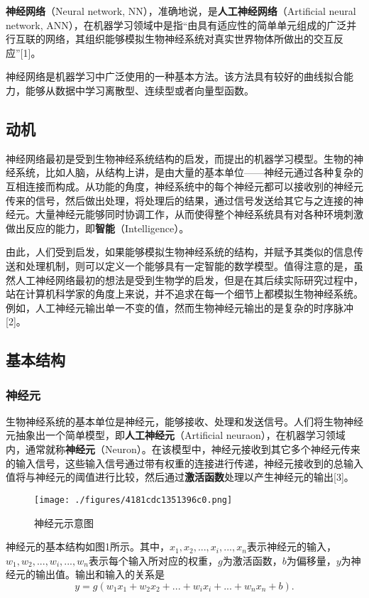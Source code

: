 
\textbf{神经网络}（Neural network, NN），准确地说，是\textbf{人工神经网络}（Artificial neural network, ANN），在机器学习领域中是指“由具有适应性的简单单元组成的广泛并行互联的网络，其组织能够模拟生物神经系统对真实世界物体所做出的交互反应”[1]。

神经网络是机器学习中广泛使用的一种基本方法。该方法具有较好的曲线拟合能力，能够从数据中学习离散型、连续型或者向量型函数。

\subsection{动机}

神经网络最初是受到生物神经系统结构的启发，而提出的机器学习模型。生物的神经系统，比如人脑，从结构上讲，是由大量的基本单位——神经元通过各种复杂的互相连接而构成。从功能的角度，神经系统中的每个神经元都可以接收别的神经元传来的信号，然后做出处理，将处理后的结果，通过信号发送给其它与之连接的神经元。大量神经元能够同时协调工作，从而使得整个神经系统具有对各种环境刺激做出反应的能力，即\textbf{智能}（Intelligence）。

由此，人们受到启发，如果能够模拟生物神经系统的结构，并赋予其类似的信息传送和处理机制，则可以定义一个能够具有一定智能的数学模型。值得注意的是，虽然人工神经网络最初的想法是受到生物学的启发，但是在其后续实际研究过程中，站在计算机科学家的角度上来说，并不追求在每一个细节上都模拟生物神经系统。例如，人工神经元输出单一不变的值，然而生物神经元输出的是复杂的时序脉冲[2]。

\subsection{基本结构}

\subsubsection{神经元}

生物神经系统的基本单位是神经元，能够接收、处理和发送信号。人们将生物神经元抽象出一个简单模型，即\textbf{人工神经元}（Artificial neuraon），在机器学习领域内，通常就称\textbf{神经元}（Neuron）。在该模型中，神经元接收到其它多个神经元传来的输入信号，这些输入信号通过带有权重的连接进行传递，神经元接收到的总输入值将与神经元的阈值进行比较，然后通过\textbf{激活函数}处理以产生神经元的输出[3]。
\begin{figure}[ht]
\centering
\texttt{[image: ./figures/4181cdc1351396c0.png]}
\caption{神经元示意图} \label{fig_NN_1}
\end{figure}
神经元的基本结构如图1所示。其中，$x_1, x_2, ..., x_i, ..., x_n$表示神经元的输入，$w_1, w_2, ..., w_i, ..., w_n$表示每个输入所对应的权重，$g$为激活函数，$b$为偏移量，$y$为神经元的输出值。输出和输入的关系是
\begin{equation}
y=g(w_1x_1+w_2x_2+...+w_ix_i+...+w_nx_n+b).
\end{equation}




